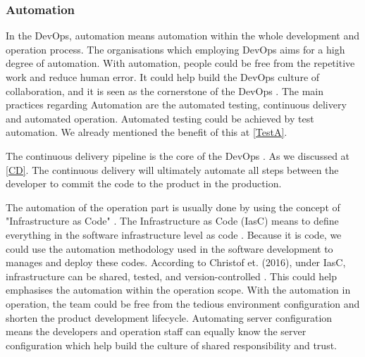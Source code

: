 \subsubsection[]{Automation}
In the DevOps, automation means 
automation within the whole development and operation process. The organisations which employing DevOps aims for a high degree of automation\cite{erich2017qualitative}.
With automation, people could be free from the repetitive work and reduce human error. It could help build the DevOps culture of collaboration, and it is seen as the cornerstone of the DevOps \cite{DevOpsCu76:online}.
The main practices regarding Automation are the automated testing, continuous delivery and automated operation. Automated testing could be achieved by test automation. We already mentioned the benefit of this at \ref{TestA}.
\par
The continuous delivery pipeline is the core of the DevOps \cite{gill2018devops}. As we discussed at \ref{CD}. The continuous delivery will ultimately automate all steps between the developer to commit the code to the product in the production.
\par
\label{iasc}
The automation of the operation part is usually done by using the concept of "Infrastructure as Code" \cite{lwakatare2015dimensions}. The Infrastructure as Code (IasC) means to define everything in the software infrastructure level as code \cite{artac2017devops}. Because it is code, we could use the automation methodology used in the software development to manages and deploy these codes. According to Christof et. (2016), under IasC, infrastructure can be shared, tested, and version-controlled \cite{ebert2016devops}. This could help emphasises the automation within the operation scope. With the automation in operation, the team could be free from the tedious environment configuration and shorten the product development lifecycle. Automating server configuration means the developers and operation staff can equally know the server configuration \cite{DevOpsCu76:online} which help build the culture of shared responsibility and trust.
